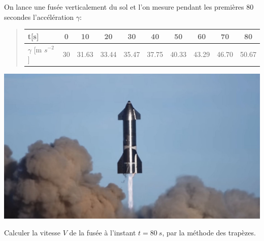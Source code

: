 \documentclass[%
oneside,                 %
final,                   %
10pt,french]{article}
\newenvironment{doconceexercise}{}{}
\newcounter{doconceexercisecounter}
\begin{document}
\begin{doconceexercise}



On lance une fusée verticalement du sol et l’on mesure pendant les premières 80 secondes l'accélération $\gamma$:


\begin{quote}
\begin{tabular}{lccccccccc}
\hline
\multicolumn{1}{l}{ t[s] } & \multicolumn{1}{c}{ 0 } & \multicolumn{1}{c}{ 10 } & \multicolumn{1}{c}{ 20 } & \multicolumn{1}{c}{ 30 } & \multicolumn{1}{c}{ 40 } & \multicolumn{1}{c}{ 50 } & \multicolumn{1}{c}{ 60 } & \multicolumn{1}{c}{ 70 } & \multicolumn{1}{c}{ 80 } \\
\hline
$\gamma$ [m $s^{-2}$] & 30 & 31.63 & 33.44 & 35.47 & 37.75 & 40.33 & 43.29 & 46.70 & 50.67 \\
\hline
\end{tabular}
\end{quote}

\noindent


\vspace{6mm}

\centerline{\includegraphics[width=0.7\linewidth]{imgs/SpaceX-Starship.jpg}}

\vspace{6mm}




Calculer la vitesse $V$ de la fusée à l’instant $t=80 \ s$, par la méthode des trapèzes.





\end{doconceexercise}
\end{document}

